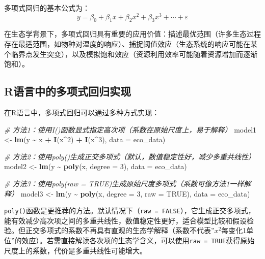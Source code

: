 \documentclass[
  twoside,12pt,fontset=none]{ctexbook}
\newenvironment{Shaded}{\begin{snugshade}}{\end{snugshade}}
\newcommand{\AttributeTok}[1]{\textcolor[rgb]{0.13,0.29,0.53}{#1}}
\newcommand{\CommentTok}[1]{\textcolor[rgb]{0.56,0.35,0.01}{\textit{#1}}}
\newcommand{\ConstantTok}[1]{\textcolor[rgb]{0.56,0.35,0.01}{#1}}
\newcommand{\DecValTok}[1]{\textcolor[rgb]{0.00,0.00,0.81}{#1}}
\newcommand{\FunctionTok}[1]{\textcolor[rgb]{0.13,0.29,0.53}{\textbf{#1}}}
\newcommand{\NormalTok}[1]{#1}
\newcommand{\OtherTok}[1]{\textcolor[rgb]{0.56,0.35,0.01}{#1}}
\newcommand{\SpecialCharTok}[1]{\textcolor[rgb]{0.81,0.36,0.00}{\textbf{#1}}}
\begin{document}
多项式回归的基本公式为：\[y = \beta_0 + \beta_1 x + \beta_2 x^2 + \beta_3 x^3 + \cdots + \varepsilon\]

在生态学背景下，多项式回归具有重要的应用价值：描述最优范围（许多生态过程存在最适范围，如物种对温度的响应）、捕捉阈值效应（生态系统的响应可能在某个临界点发生突变），以及模拟饱和效应（资源利用效率可能随着资源增加而逐渐饱和）。

\hypertarget{rux8bedux8a00ux4e2dux7684ux591aux9879ux5f0fux56deux5f52ux5b9eux73b0}{%
\subsection{R语言中的多项式回归实现}\label{rux8bedux8a00ux4e2dux7684ux591aux9879ux5f0fux56deux5f52ux5b9eux73b0}}

在R语言中，多项式回归可以通过多种方式实现：

\begin{Shaded}
\begin{Highlighting}[]
\CommentTok{\# 方法1：使用I()函数显式指定高次项（系数在原始尺度上，易于解释）}
\NormalTok{model1 }\OtherTok{\textless{}{-}} \FunctionTok{lm}\NormalTok{(y }\SpecialCharTok{\textasciitilde{}}\NormalTok{ x }\SpecialCharTok{+} \FunctionTok{I}\NormalTok{(x}\SpecialCharTok{\^{}}\DecValTok{2}\NormalTok{) }\SpecialCharTok{+} \FunctionTok{I}\NormalTok{(x}\SpecialCharTok{\^{}}\DecValTok{3}\NormalTok{), }\AttributeTok{data =}\NormalTok{ eco\_data)}

\CommentTok{\# 方法2：使用poly()生成正交多项式（默认，数值稳定性好，减少多重共线性）}
\NormalTok{model2 }\OtherTok{\textless{}{-}} \FunctionTok{lm}\NormalTok{(y }\SpecialCharTok{\textasciitilde{}} \FunctionTok{poly}\NormalTok{(x, }\AttributeTok{degree =} \DecValTok{3}\NormalTok{), }\AttributeTok{data =}\NormalTok{ eco\_data)}

\CommentTok{\# 方法3：使用poly(raw = TRUE)生成原始尺度多项式（系数可像方法1一样解释）}
\NormalTok{model3 }\OtherTok{\textless{}{-}} \FunctionTok{lm}\NormalTok{(y }\SpecialCharTok{\textasciitilde{}} \FunctionTok{poly}\NormalTok{(x, }\AttributeTok{degree =} \DecValTok{3}\NormalTok{, }\AttributeTok{raw =} \ConstantTok{TRUE}\NormalTok{), }\AttributeTok{data =}\NormalTok{ eco\_data)}
\end{Highlighting}
\end{Shaded}

\texttt{poly()}函数是更推荐的方法。默认情况下（\texttt{raw\ =\ FALSE}），它生成正交多项式，能有效减少高次项之间的多重共线性，数值稳定性更好，适合模型比较和假设检验。但正交多项式的系数不再具有直观的生态学解释（系数不代表''\(x^2\)每变化1单位''的效应）。若需直接解读各次项的生态学含义，可以使用\texttt{raw\ =\ TRUE}获得原始尺度上的系数，代价是多重共线性可能增大。
\end{document}
